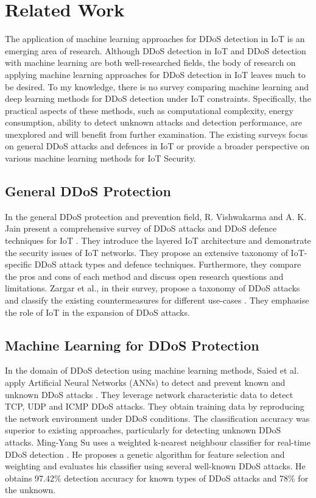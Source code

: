 \documentclass[conference, 11pt]{IEEEtran}
\begin{document}
    \section{Related Work}
    The application of machine learning approaches for DDoS detection in IoT is an emerging area of research.
    Although DDoS detection in IoT and DDoS detection with machine learning are both well-researched fields, the body of research on applying machine learning approaches for DDoS detection in IoT leaves much to be desired.
    To my knowledge, there is no survey comparing machine learning and deep learning methods for DDoS detection under IoT constraints.
    Specifically, the practical aspects of these methods, such as computational complexity, energy consumption, ability to detect unknown attacks and detection performance, are unexplored and will benefit from further examination.
    The existing surveys focus on general DDoS attacks and defences in IoT or provide a broader perspective on various machine learning methods for IoT Security.

    \subsection{General DDoS Protection}
    In the general DDoS protection and prevention field, R. Vishwakarma and A. K. Jain present a comprehensive survey of DDoS attacks and DDoS defence techniques for IoT \cite{article:14}.
    They introduce the layered IoT architecture and demonstrate the security issues of IoT networks.
    They propose an extensive taxonomy of IoT-specific DDoS attack types and defence techniques.
    Furthermore, they compare the pros and cons of each method and discuss open research questions and limitations.
    Zargar et al., in their survey, propose a taxonomy of DDoS attacks and classify the existing countermeasures for different use-cases \cite{zargar2013survey}.
    They emphasise the role of IoT in the expansion of DDoS attacks.

    \subsection{Machine Learning for DDoS Protection}
    In the domain of DDoS detection using machine learning methods, Saied et al. apply Artificial Neural Networks (ANNs) to detect and prevent known and unknown DDoS attacks \cite{article:13}.
    They leverage network characteristic data to detect TCP, UDP and ICMP DDoS attacks.
    They obtain training data by reproducing the network environment under DDoS conditions.
    The classification accuracy was superior to existing approaches, particularly for detecting unknown DDoS attacks.
    Ming-Yang Su uses a weighted k-nearest neighbour classifier for real-time DDoS detection \cite{article:2}.
    He proposes a genetic algorithm for feature selection and weighting and evaluates his classifier using several well-known DDoS attacks.
    He obtains 97.42\% detection accuracy for known types of DDoS attacks and 78\% for the unknown.
\end{document}
